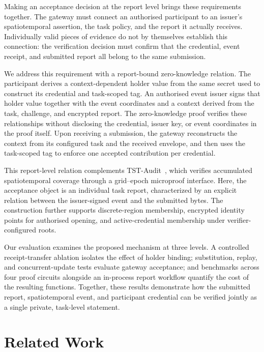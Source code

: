 \documentclass[pdflatex,iicol,sn-mathphys-num]{sn-jnl}
\begin{document}
Making an acceptance decision at the report level brings these requirements together. The gateway must connect an authorised participant to an issuer's spatiotemporal assertion, the task policy, and the report it actually receives. Individually valid pieces of evidence do not by themselves establish this connection: the verification decision must confirm that the credential, event receipt, and submitted report all belong to the same submission.

We address this requirement with a report-bound zero-knowledge relation. The participant derives a context-dependent holder value from the same secret used to construct its credential and task-scoped tag. An authorised event issuer signs that holder value together with the event coordinates and a context derived from the task, challenge, and encrypted report. The zero-knowledge proof verifies these relationships without disclosing the credential, issuer key, or event coordinates in the proof itself. Upon receiving a submission, the gateway reconstructs the context from its configured task and the received envelope, and then uses the task-scoped tag to enforce one accepted contribution per credential.

This report-level relation complements TST-Audit~\citep{He2026TSTAudit}, which verifies accumulated spatiotemporal coverage through a grid--epoch microproof interface. Here, the acceptance object is an individual task report, characterized by an explicit relation between the issuer-signed event and the submitted bytes. The construction further supports discrete-region membership, encrypted identity points for authorised opening, and active-credential membership under verifier-configured roots.

Our evaluation examines the proposed mechanism at three levels. A controlled receipt-transfer ablation isolates the effect of holder binding; substitution, replay, and concurrent-update tests evaluate gateway acceptance; and benchmarks across four proof circuits alongside an in-process report workflow quantify the cost of the resulting functions. Together, these results demonstrate how the submitted report, spatiotemporal event, and participant credential can be verified jointly as a single private, task-level statement.

\section{Related Work}
\end{document}
